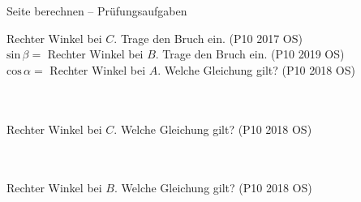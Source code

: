 \setcounter{aufgabe}{4}

\begin{aufgabe}{Seite berechnen – Prüfungsaufgaben}
\begin{teile}
\teil Rechter Winkel bei $C$. Trage den Bruch ein. \hfill (P10 2017 OS) \\

$\mathrm{sin}\,\beta =$ \leerfeld
\teil Rechter Winkel bei $B$. Trage den Bruch ein. \hfill (P10 2019 OS) \\

$\mathrm{cos}\,\alpha =$ \leerfeld
\teil Rechter Winkel bei $A$. Welche Gleichung gilt? \hfill (P10 2018 OS) \\  \\  \\ 

\teil Rechter Winkel bei $C$. Welche Gleichung gilt? \hfill (P10 2018 OS) \\  \\  \\ 

\teil Rechter Winkel bei $B$. Welche Gleichung gilt? \hfill (P10 2018 OS) \\  \\  \\ 

\end{teile}
\end{aufgabe}


